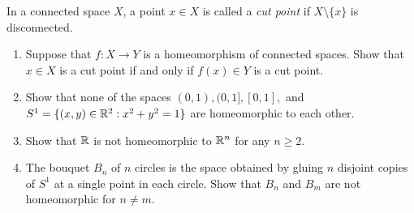 \documentclass[12pt]{article}
\begin{document}
\begin{problab}{2}
In a connected space $X$, a point $x \in X$ is called a \emph{cut point} if $X \setminus \{ x \}$ is disconnected. 
    \begin{enumerate}
        \item Suppose that $f: X \to Y$ is a homeomorphism of connected spaces. Show that $x \in X$ is a cut point if and only if $f(x) \in Y$ is a cut point. 
        \item Show that none of the spaces $(0,1), (0,1], [0,1],$ and $S^1 = \{ (x,y) \in \mathbb R^2 : x^2 + y^2 =1 \} $ are homeomorphic to each other. 
        \item Show that $\mathbb R$ is not homeomorphic to $\mathbb R^n$ for any $n \geq 2$. 
        \item The bouquet $B_n$ of $n$ circles is the space obtained by gluing $n$ disjoint copies of $S^1$ at a single point in each circle. Show that $B_n$ and $B_m$ are not homeomorphic for $n \neq m$. 
    \end{enumerate}
\end{problab}
\end{document}

